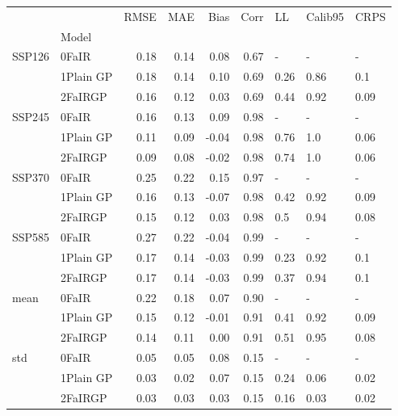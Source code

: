 \begin{tabular}{llrrrrlll}
\toprule
    &         &  RMSE &   MAE &  Bias &  Corr &    LL & Calib95 &  CRPS \\
{} & Model &       &       &       &       &       &         &       \\
\midrule
SSP126 & 0FaIR &  0.18 &  0.14 &  0.08 &  0.67 &     - &       - &     - \\
    & 1Plain GP &  0.18 &  0.14 &  0.10 &  0.69 &  0.26 &    0.86 &   0.1 \\
    & 2FaIRGP &  0.16 &  0.12 &  0.03 &  0.69 &  0.44 &    0.92 &  0.09 \\
SSP245 & 0FaIR &  0.16 &  0.13 &  0.09 &  0.98 &     - &       - &     - \\
    & 1Plain GP &  0.11 &  0.09 & -0.04 &  0.98 &  0.76 &     1.0 &  0.06 \\
    & 2FaIRGP &  0.09 &  0.08 & -0.02 &  0.98 &  0.74 &     1.0 &  0.06 \\
SSP370 & 0FaIR &  0.25 &  0.22 &  0.15 &  0.97 &     - &       - &     - \\
    & 1Plain GP &  0.16 &  0.13 & -0.07 &  0.98 &  0.42 &    0.92 &  0.09 \\
    & 2FaIRGP &  0.15 &  0.12 &  0.03 &  0.98 &   0.5 &    0.94 &  0.08 \\
SSP585 & 0FaIR &  0.27 &  0.22 & -0.04 &  0.99 &     - &       - &     - \\
    & 1Plain GP &  0.17 &  0.14 & -0.03 &  0.99 &  0.23 &    0.92 &   0.1 \\
    & 2FaIRGP &  0.17 &  0.14 & -0.03 &  0.99 &  0.37 &    0.94 &   0.1 \\
mean & 0FaIR &  0.22 &  0.18 &  0.07 &  0.90 &     - &       - &     - \\
    & 1Plain GP &  0.15 &  0.12 & -0.01 &  0.91 &  0.41 &    0.92 &  0.09 \\
    & 2FaIRGP &  0.14 &  0.11 &  0.00 &  0.91 &  0.51 &    0.95 &  0.08 \\
std & 0FaIR &  0.05 &  0.05 &  0.08 &  0.15 &     - &       - &     - \\
    & 1Plain GP &  0.03 &  0.02 &  0.07 &  0.15 &  0.24 &    0.06 &  0.02 \\
    & 2FaIRGP &  0.03 &  0.03 &  0.03 &  0.15 &  0.16 &    0.03 &  0.02 \\
\bottomrule
\end{tabular}

